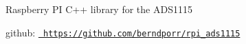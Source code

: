 Raspberry PI C++ library for the A\+D\+S1115

github\+: \href{https://github.com/berndporr/rpi_ads1115}{\texttt{ https\+://github.\+com/berndporr/rpi\+\_\+ads1115}} 